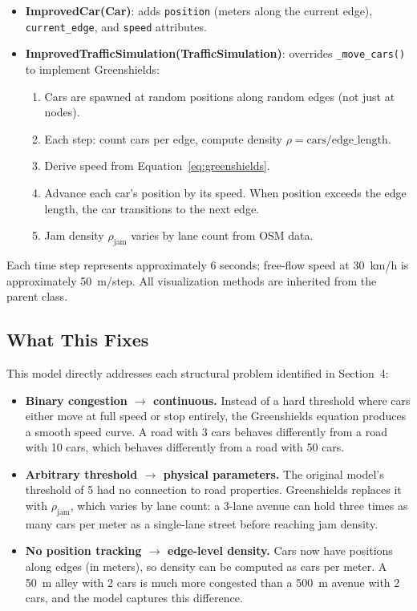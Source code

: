 \documentclass[12pt]{article}
\begin{document}
\begin{itemize}
    \item \textbf{ImprovedCar(Car)}: adds \texttt{position} (meters along the current edge), \texttt{current\_edge}, and \texttt{speed} attributes.
    \item \textbf{ImprovedTrafficSimulation(TrafficSimulation)}: overrides \texttt{\_move\_cars()} to implement Greenshields:
    \begin{enumerate}
        \item Cars are spawned at random positions along random edges (not just at nodes).
        \item Each step: count cars per edge, compute density $\rho = \text{cars} / \text{edge\_length}$.
        \item Derive speed from Equation~\ref{eq:greenshields}.
        \item Advance each car's position by its speed. When position exceeds the edge length, the car transitions to the next edge.
        \item Jam density $\rho_{\text{jam}}$ varies by lane count from OSM data.
    \end{enumerate}
\end{itemize}

Each time step represents approximately 6 seconds; free-flow speed at 30~km/h is approximately 50~m/step. All visualization methods are inherited from the parent class.

\subsection{What This Fixes}

This model directly addresses each structural problem identified in Section~4:

\begin{itemize}
    \item \textbf{Binary congestion $\to$ continuous.} Instead of a hard threshold where cars either move at full speed or stop entirely, the Greenshields equation produces a smooth speed curve. A road with 3 cars behaves differently from a road with 10 cars, which behaves differently from a road with 50 cars.
    \item \textbf{Arbitrary threshold $\to$ physical parameters.} The original model's threshold of 5 had no connection to road properties. Greenshields replaces it with $\rho_{\text{jam}}$, which varies by lane count: a 3-lane avenue can hold three times as many cars per meter as a single-lane street before reaching jam density.
    \item \textbf{No position tracking $\to$ edge-level density.} Cars now have positions along edges (in meters), so density can be computed as cars per meter. A 50~m alley with 2 cars is much more congested than a 500~m avenue with 2 cars, and the model captures this difference.
\end{itemize}
\end{document}
